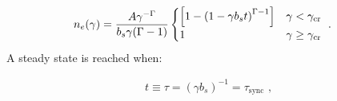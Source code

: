 \begin{equation}
    \begin{aligned}
    n_e\qty(\gamma)&=\frac{A\gamma^{-\Gamma}}{b_s\gamma\qty(\Gamma-1)}
	\begin{cases}
		\qty[1-\qty(1-\gamma b_s t)^{\Gamma-1}] &\gamma < \gamma_\text{cr}\\
		1 &\gamma \geq \gamma_\text{cr}\\
	\end{cases} \text{ .}
    \end{aligned} \label{eq:chapter_7_cont_leptonic_cr_energy_distrib}
\end{equation}
\noindent A steady state is reached when:

\begin{equation}
    \begin{aligned}
        t\equiv\tau = (\gamma b_s)^{-1} = \tau_\text{sync}\text{ ,}
    \end{aligned} \label{eq:07_cont_leptonic_cr_steady_state}
\end{equation}
